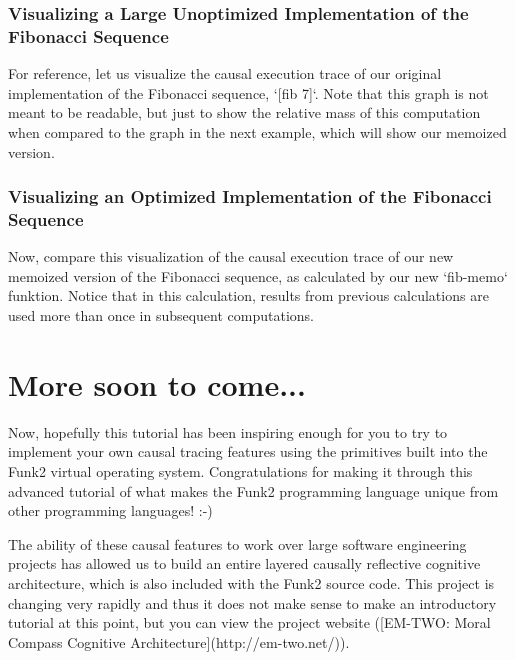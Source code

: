 \subsubsection{Visualizing a Large Unoptimized Implementation of the Fibonacci Sequence}

For reference, let us visualize the causal execution trace of our
original implementation of the Fibonacci sequence, `[fib 7]`.  Note
that this graph is not meant to be readable, but just to show the
relative mass of this computation when compared to the graph in the
next example, which will show our memoized version.

%


\subsubsection{Visualizing an Optimized Implementation of the Fibonacci Sequence}

Now, compare this visualization of the causal execution trace of our
new memoized version of the Fibonacci sequence, as calculated by our
new `fib-memo` funktion.  Notice that in this calculation, results
from previous calculations are used more than once in subsequent
computations.

%


\section{More soon to come...}

Now, hopefully this tutorial has been inspiring enough for you to try
to implement your own causal tracing features using the primitives
built into the Funk2 virtual operating system.  Congratulations for
making it through this advanced tutorial of what makes the Funk2
programming language unique from other programming languages!  :-)

The ability of these causal features to work over large software
engineering projects has allowed us to build an entire layered
causally reflective cognitive architecture, which is also included
with the Funk2 source code.  This project is changing very rapidly and
thus it does not make sense to make an introductory tutorial at this
point, but you can view the project website ([EM-TWO: Moral Compass
  Cognitive Architecture](http://em-two.net/)).

